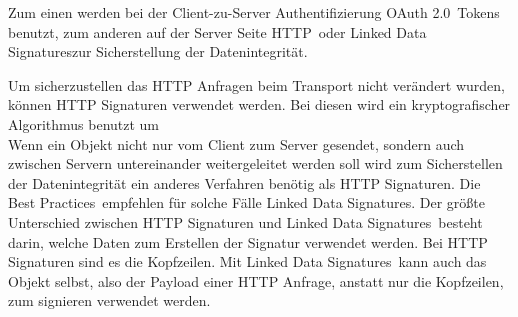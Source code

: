 	Zum einen werden bei der Client-zu-Server Authentifizierung \glqq OAuth 2.0\grqq~Tokens benutzt, zum anderen auf der Server Seite \glqq HTTP\grqq~oder \glqq Linked Data Signatures\grqq zur Sicherstellung der Datenintegrität.\\
	
	
	
	Um sicherzustellen das HTTP Anfragen beim Transport nicht verändert wurden, können HTTP Signaturen verwendet werden. Bei diesen wird ein kryptografischer Algorithmus benutzt um \\
	Wenn ein Objekt nicht nur vom Client zum Server gesendet, sondern auch zwischen Servern untereinander weitergeleitet werden soll wird zum Sicherstellen der Datenintegrität ein anderes Verfahren benötig als HTTP Signaturen. Die \glqq Best Practices\grqq~empfehlen für solche Fälle \glqq Linked Data Signatures\grqq. Der größte Unterschied zwischen HTTP Signaturen und \glqq Linked Data Signatures\grqq~besteht darin, welche Daten zum Erstellen der Signatur verwendet werden. Bei HTTP Signaturen sind es die Kopfzeilen. Mit \glqq Linked Data Signatures\grqq~kann auch das Objekt selbst, also der Payload einer HTTP Anfrage, anstatt nur die Kopfzeilen, zum signieren verwendet werden.
